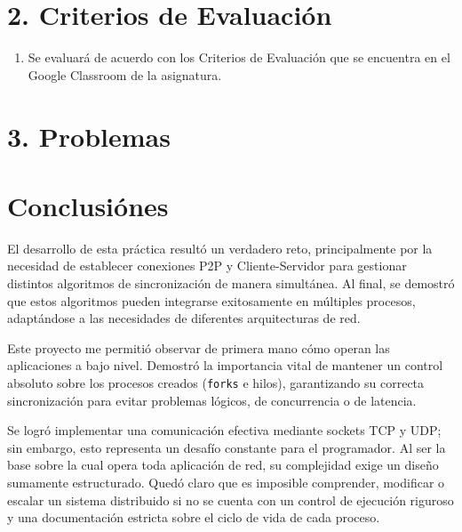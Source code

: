 \documentclass[12pt]{article}
\begin{document}
\section{\large 2. Criterios de Evaluación}

\begin{enumerate}
    \item Se evaluará de acuerdo con los Criterios de Evaluación que se encuentra en el Google Classroom de la asignatura.
\end{enumerate}

\section{\large 3. Problemas}











\newpage
\section{Conclusiónes}

El desarrollo de esta práctica resultó un verdadero reto, principalmente por la necesidad de establecer conexiones P2P y Cliente-Servidor para gestionar distintos algoritmos de sincronización de manera simultánea. Al final, se demostró que estos algoritmos pueden integrarse exitosamente en múltiples procesos, adaptándose a las necesidades de diferentes arquitecturas de red.

Este proyecto me permitió observar de primera mano cómo operan las aplicaciones a bajo nivel. Demostró la importancia vital de mantener un control absoluto sobre los procesos creados (\texttt{forks} e hilos), garantizando su correcta sincronización para evitar problemas lógicos, de concurrencia o de latencia.

Se logró implementar una comunicación efectiva mediante sockets TCP y UDP; sin embargo, esto representa un desafío constante para el programador. Al ser la base sobre la cual opera toda aplicación de red, su complejidad exige un diseño sumamente estructurado. Quedó claro que es imposible comprender, modificar o escalar un sistema distribuido si no se cuenta con un control de ejecución riguroso y una documentación estricta sobre el ciclo de vida de cada proceso.
\end{document}

